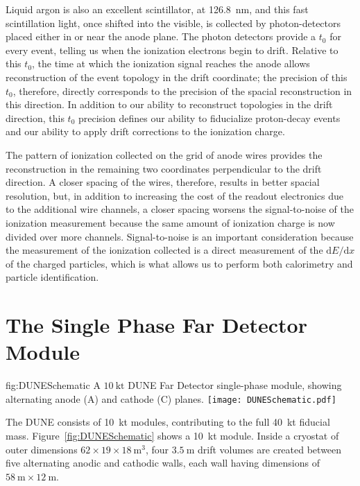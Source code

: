 Liquid argon is also an excellent scintillator, at \SI{126.8}{\nano\meter}, and this fast scintillation light, once shifted into the visible, is collected by photon-detectors placed either in or near the anode plane. The photon detectors provide a $t_{0}$ for every event, telling us when the ionization electrons begin to drift. Relative to this $t_{0}$, the time at which the ionization signal reaches the anode allows reconstruction of the event topology in the drift coordinate; the precision of this $t_{0}$, therefore, directly corresponds to the precision of the spacial reconstruction in this direction. In addition to our ability to reconstruct topologies in the drift direction, this $t_{0}$ precision defines our ability to fiducialize proton-decay events and our ability to apply drift corrections to the ionization charge.

The pattern of ionization collected on the grid of anode wires provides the reconstruction in the remaining two coordinates perpendicular to the drift direction. A closer spacing of the wires, therefore, results in better spacial resolution, but, in addition to increasing the cost of the readout electronics due to the additional wire channels, a closer spacing worsens the signal-to-noise of the ionization measurement because the same amount of ionization charge is now divided over more channels. Signal-to-noise is an important consideration because the measurement of the ionization collected is a direct measurement of the $\mathrm{d}E/\mathrm{d}x$ of the charged particles, which is what allows us to perform both calorimetry and particle identification.

\section{The  Single Phase Far Detector Module}
\label{sec:fdsp-exec-dunefd}

\begin{dunefigure}{fig:DUNESchematic}
{A $\SI{10}{\kilo\tonne}$ DUNE Far Detector single-phase module, showing alternating anode (A) and cathode (C) planes.}
\texttt{[image: DUNESchematic.pdf]}
\end{dunefigure}

The DUNE   consists of \SI{10}{\kilo\tonne} modules, contributing to the full \SI{40}{\kilo\tonne}  fiducial mass. Figure~\ref{fig:DUNESchematic} shows a \SI{10}{\kilo\tonne} module. Inside a cryostat of outer dimensions $62\times 19\times \SI{18}{\meter^{3}}$, four $\SI{3.5}{\meter}$ drift volumes are created between five alternating anodic and cathodic walls, each wall having dimensions of $\SI{58}{\meter}\times \SI{12}{\meter}$.

